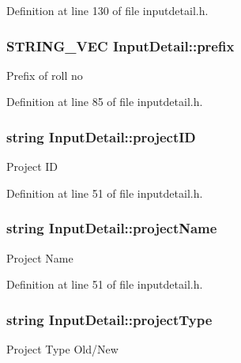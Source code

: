 \-Definition at line 130 of file inputdetail.\-h.

\hypertarget{classInputDetail_af81c2cdf9b1336634bbb33165921d879}{
\subsubsection[{prefix}]{\setlength{\rightskip}{0pt plus 5cm}\-S\-T\-R\-I\-N\-G\-\_\-\-V\-E\-C {\bf \-Input\-Detail\-::prefix}}}\label{classInputDetail_af81c2cdf9b1336634bbb33165921d879}
\-Prefix of roll no 

\-Definition at line 85 of file inputdetail.\-h.

\hypertarget{classInputDetail_a08069ee622c626c038b821ddcc7427b4}{
\subsubsection[{project\-I\-D}]{\setlength{\rightskip}{0pt plus 5cm}string {\bf \-Input\-Detail\-::project\-I\-D}}}\label{classInputDetail_a08069ee622c626c038b821ddcc7427b4}
\-Project \-I\-D 

\-Definition at line 51 of file inputdetail.\-h.

\hypertarget{classInputDetail_aaaf51475a2a4ddbe34e38c96bdb45bad}{
\subsubsection[{project\-Name}]{\setlength{\rightskip}{0pt plus 5cm}string {\bf \-Input\-Detail\-::project\-Name}}}\label{classInputDetail_aaaf51475a2a4ddbe34e38c96bdb45bad}
\-Project \-Name 

\-Definition at line 51 of file inputdetail.\-h.

\hypertarget{classInputDetail_ad2c46fdc8093eb88e01497e55b2e8e4d}{
\subsubsection[{project\-Type}]{\setlength{\rightskip}{0pt plus 5cm}string {\bf \-Input\-Detail\-::project\-Type}}}\label{classInputDetail_ad2c46fdc8093eb88e01497e55b2e8e4d}
\-Project \-Type \-Old/\-New 

